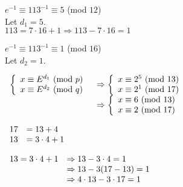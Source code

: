 \documentclass[a4paper, 11pt]{article}
\begin{document}
\begin{myEnumerate}
\begin{myEnumerate}
        $e^{-1} \equiv 113^{-1} \equiv 5$ (mod $12$) \\
        Let $d_{1} = 5$. \\
        
        $113 = 7 \cdot 16 + 1 \Rightarrow 113 - 7 \cdot 16 = 1$
        
        $e^{-1} \equiv 113^{-1} \equiv 1$ (mod $16$) \\
        Let $d_{2} = 1$.
        
        \( \\
        \begin{array}{ll}
        	\left\{
    			\begin{array}{ll}
        			x \equiv E^{d_{1}} $ $ ($mod $ p) \\
        			x \equiv E^{d_{2}} $ $ ($mod $ q)
    			\end{array}
			\right.
        	& \Rightarrow
            \left\{
    			\begin{array}{ll}
        			x \equiv 2^{5} $ $ ($mod $ 13) \\
        			x \equiv 2^{1} $ $ ($mod $ 17)
    			\end{array}
			\right. \\
            
            & \Rightarrow
            \left\{
    			\begin{array}{ll}
        			x \equiv 6 $ $ ($mod $ 13) \\
        			x \equiv 2 $ $ ($mod $ 17)
    			\end{array}
			\right.
        \end{array} \\ \)
        
        \(
        \begin{array}{ll}
        	17 & = 13 + 4 \\
			13 & = 3 \cdot 4 + 1 \\
        \end{array} \\ \)
        
        \(
        \begin{array}{ll}
        	13 = 3 \cdot 4 + 1 & \Rightarrow 13 - 3 \cdot 4 = 1 \\
            				   & \Rightarrow 13 - 3(17 - 13) = 1 \\
                               & \Rightarrow 4 \cdot 13 - 3 \cdot 17 = 1
        \end{array} \\ \)
        

\end{myEnumerate}
\end{myEnumerate}
\end{document}
